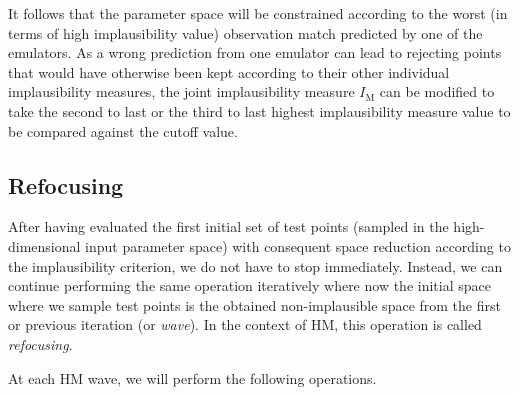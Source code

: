\noindent
It follows that the parameter space will be constrained according to the worst (in terms of high implausibility value) observation match predicted by one of the emulators. As a wrong prediction from one emulator can lead to rejecting points that would have otherwise been kept according to their other individual implausibility measures, the joint implausibility measure $I_{\text{M}}$ can be modified to take the second to last or the third to last highest implausibility measure value to be compared against the cutoff value.


%
%
%
\subsection{Refocusing}\label{sec:ch3refocusing}
After having evaluated the first initial set of test points (sampled in the high-dimensional input parameter space) with consequent space reduction according to the implausibility criterion, we do not have to stop immediately. Instead, we can continue performing the same operation iteratively where now the initial space where we sample test points is the obtained non-implausible space from the first or previous iteration (or \textit{wave}). In the context of HM, this operation is called \textit{refocusing}.

\vspace{0.2cm}\noindent
At each HM wave, we will perform the following operations.

